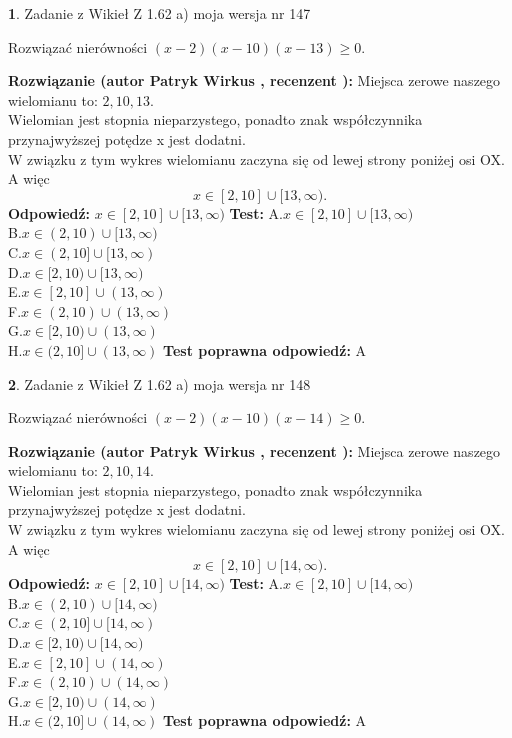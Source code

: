 \documentclass[12pt, a4paper]{article}
\theoremstyle{definition} %
\newtheorem{zad}{}
\newcommand{\zadStart}[1]{\begin{zad}#1\newline}
\newcommand{\zadStop}{\end{zad}}
\newcommand{\rozwStart}[2]{\noindent \textbf{Rozwiązanie (autor #1 , recenzent #2): }\newline}
\newcommand{\rozwStop}{\newline}
\newcommand{\odpStart}{\noindent \textbf{Odpowiedź:}\newline}
\newcommand{\odpStop}{\newline}
\newcommand{\testStart}{\noindent \textbf{Test:}\newline}
\newcommand{\testStop}{\newline}
\newcommand{\kluczStart}{\noindent \textbf{Test poprawna odpowiedź:}\newline}
\newcommand{\kluczStop}{\newline}
\begin{document}
\zadStart{Zadanie z Wikieł Z 1.62 a) moja wersja nr 147}

Rozwiązać nierówności $(x-2)(x-10)(x-13)\ge0$.
\zadStop
\rozwStart{Patryk Wirkus}{}
Miejsca zerowe naszego wielomianu to: $2, 10, 13$.\\
Wielomian jest stopnia nieparzystego, ponadto znak współczynnika przy\linebreak najwyższej potędze x jest dodatni.\\ W związku z tym wykres wielomianu zaczyna się od lewej strony poniżej osi OX. A więc $$x \in [2,10] \cup [13,\infty).$$
\rozwStop
\odpStart
$x \in [2,10] \cup [13,\infty)$
\odpStop
\testStart
A.$x \in [2,10] \cup [13,\infty)$\\
B.$x \in (2,10) \cup [13,\infty)$\\
C.$x \in (2,10] \cup [13,\infty)$\\
D.$x \in [2,10) \cup [13,\infty)$\\
E.$x \in [2,10] \cup (13,\infty)$\\
F.$x \in (2,10) \cup (13,\infty)$\\
G.$x \in [2,10) \cup (13,\infty)$\\
H.$x \in (2,10] \cup (13,\infty)$
\testStop
\kluczStart
A
\kluczStop



\zadStart{Zadanie z Wikieł Z 1.62 a) moja wersja nr 148}

Rozwiązać nierówności $(x-2)(x-10)(x-14)\ge0$.
\zadStop
\rozwStart{Patryk Wirkus}{}
Miejsca zerowe naszego wielomianu to: $2, 10, 14$.\\
Wielomian jest stopnia nieparzystego, ponadto znak współczynnika przy\linebreak najwyższej potędze x jest dodatni.\\ W związku z tym wykres wielomianu zaczyna się od lewej strony poniżej osi OX. A więc $$x \in [2,10] \cup [14,\infty).$$
\rozwStop
\odpStart
$x \in [2,10] \cup [14,\infty)$
\odpStop
\testStart
A.$x \in [2,10] \cup [14,\infty)$\\
B.$x \in (2,10) \cup [14,\infty)$\\
C.$x \in (2,10] \cup [14,\infty)$\\
D.$x \in [2,10) \cup [14,\infty)$\\
E.$x \in [2,10] \cup (14,\infty)$\\
F.$x \in (2,10) \cup (14,\infty)$\\
G.$x \in [2,10) \cup (14,\infty)$\\
H.$x \in (2,10] \cup (14,\infty)$
\testStop
\kluczStart
A
\kluczStop
\end{document}
